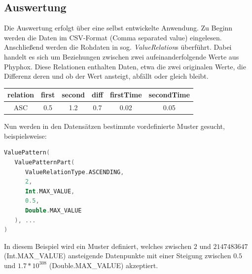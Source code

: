 \documentclass{article}
\begin{document}
\begin{multicols*}{3}
   \section*{Auswertung}
   Die Auswertung erfolgt über eine selbst entwickelte Anwendung. Zu Beginn werden die Daten im CSV-Format (Comma separated value) eingelesen.\\
   Anschließend werden die Rohdaten in sog. \emph{ValueRelation}s überführt. Dabei handelt es sich um Beziehungen zwischen zwei aufeinanderfolgende Werte aus Phyphox.
   Diese Relationen enthalten Daten, etwa die zwei originalen Werte, die Differenz deren und ob der Wert ansteigt, abfällt oder gleich bleibt.\\
   \begin{center}
      \captionsetup{justification=centering}
      \begin{tabular}{ |c | c | c | c | c | c | }
         \hline
         relation & first & second & diff & firstTime & secondTime \\
         \hline
         ASC      & 0.5   & 1.2    & 0.7  & 0.02      & 0.05       \\
         \hline
      \end{tabular}
      \label{fig:sample_ValueRelation}
   \end{center}
   Nun werden in den Datensätzen bestimmte vordefinierte Muster gesucht, beispielsweise:\\
   \begin{lstlisting}[language=Kotlin]
ValuePattern(
   ValuePatternPart(
      ValueRelationType.ASCENDING,
      2,
      Int.MAX_VALUE,
      0.5,
      Double.MAX_VALUE
   ), ...
)
        \end{lstlisting}
   In diesem Beispiel wird ein Muster definiert, welches zwischen $2$ und $2147483647$ (Int.MAX\_VALUE) ansteigende Datenpunkte
   mit einer Steigung zwischen $0.5$ und $1.7*10^{308}$ (Double.MAX\_VALUE) akzeptiert.\\
   \begin{center}
      \captionsetup{justification=centering}
      \label{fig:sample_graphs}
   \end{center}
   \vfill\null
   \columnbreak

\end{multicols*}
\end{document}
